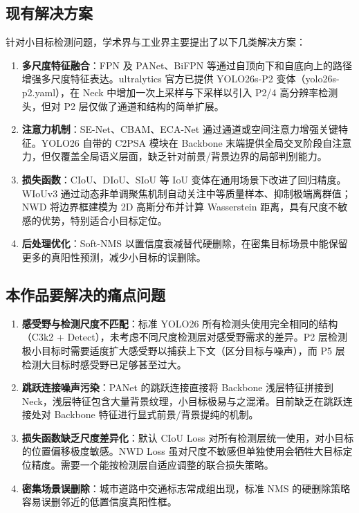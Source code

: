 \documentclass[12pt,a4paper,linespread=1.5,fontset=none]{ctexart}
\begin{document}
\subsection{现有解决方案}

针对小目标检测问题，学术界与工业界主要提出了以下几类解决方案：

\begin{enumerate}[label=(\arabic*)]
    \item \textbf{多尺度特征融合}：FPN \cite{lin2017fpn} 及 PANet、BiFPN 等通过自顶向下和自底向上的路径增强多尺度特征表达。ultralytics 官方已提供 YOLO26s-P2 变体（yolo26s-p2.yaml），在 Neck 中增加一次上采样与下采样以引入 P2/4 高分辨率检测头，但对 P2 层仅做了通道和结构的简单扩展。
    \item \textbf{注意力机制}：SE-Net、CBAM、ECA-Net \cite{wang2020eca} 通过通道或空间注意力增强关键特征。YOLO26 自带的 C2PSA 模块在 Backbone 末端提供全局交叉阶段自注意力，但仅覆盖全局语义层面，缺乏针对前景/背景边界的局部判别能力。
    \item \textbf{损失函数}：CIoU、DIoU、SIoU 等 IoU 变体在通用场景下改进了回归精度。WIoUv3 \cite{tong2023wiou} 通过动态非单调聚焦机制自动关注中等质量样本、抑制极端离群值；NWD \cite{wang2021nwd} 将边界框建模为 2D 高斯分布并计算 Wasserstein 距离，具有尺度不敏感的优势，特别适合小目标定位。
    \item \textbf{后处理优化}：Soft-NMS \cite{bodla2017soft} 以置信度衰减替代硬删除，在密集目标场景中能保留更多的真阳性预测，减少小目标的误删除。
\end{enumerate}

\subsection{本作品要解决的痛点问题}

\begin{enumerate}[label=(\arabic*)]
    \item \textbf{感受野与检测尺度不匹配}：标准 YOLO26 所有检测头使用完全相同的结构（C3k2 + Detect），未考虑不同尺度检测层对感受野需求的差异。P2 层检测极小目标时需要适度扩大感受野以捕获上下文（区分目标与噪声），而 P5 层检测大目标时感受野已足够甚至过大。
    \item \textbf{跳跃连接噪声污染}：PANet 的跳跃连接直接将 Backbone 浅层特征拼接到 Neck，浅层特征包含大量背景纹理，小目标极易与之混淆。目前缺乏在跳跃连接处对 Backbone 特征进行显式前景/背景提纯的机制。
    \item \textbf{损失函数缺乏尺度差异化}：默认 CIoU Loss 对所有检测层统一使用，对小目标的位置偏移极度敏感。NWD Loss 虽对尺度不敏感但单独使用会牺牲大目标定位精度。需要一个能按检测层自适应调整的联合损失策略。
    \item \textbf{密集场景误删除}：城市道路中交通标志常成组出现，标准 NMS 的硬删除策略容易误删邻近的低置信度真阳性框。
\end{enumerate}
\end{document}
